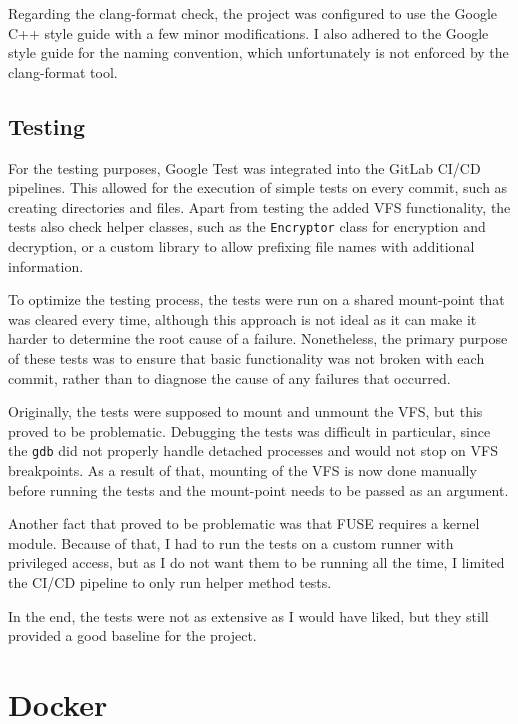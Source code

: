 Regarding the clang-format check, the project was configured to use the Google C++ style guide\cite{google_cpp_style_guide} with a few minor modifications.
I also adhered to the Google style guide for the naming convention, which unfortunately is not enforced by the clang-format tool.

\subsection{Testing}\label{subsec:testing}

For the testing purposes, Google Test was integrated into the GitLab CI/CD pipelines.
This allowed for the execution of simple tests on every commit, such as creating directories and files.
Apart from testing the added VFS functionality, the tests also check helper classes, such as the \texttt{Encryptor} class for encryption and decryption, or a custom library to allow prefixing file names with additional information.

To optimize the testing process, the tests were run on a shared mount-point that was cleared every time, although this approach is not ideal as it can make it harder to determine the root cause of a failure.
Nonetheless, the primary purpose of these tests was to ensure that basic functionality was not broken with each commit, rather than to diagnose the cause of any failures that occurred.

Originally, the tests were supposed to mount and unmount the VFS, but this proved to be problematic.
Debugging the tests was difficult in particular, since the \texttt{gdb} did not properly handle detached processes and would not stop on VFS breakpoints.
As a result of that, mounting of the VFS is now done manually before running the tests and the mount-point needs to be passed as an argument.

Another fact that proved to be problematic was that FUSE requires a kernel module.
Because of that, I had to run the tests on a custom runner with privileged access, but as I do not want them to be running all the time, I limited the CI/CD pipeline to only run helper method tests.

In the end, the tests were not as extensive as I would have liked, but they still provided a good baseline for the project.


\section{Docker}\label{sec:docker}


